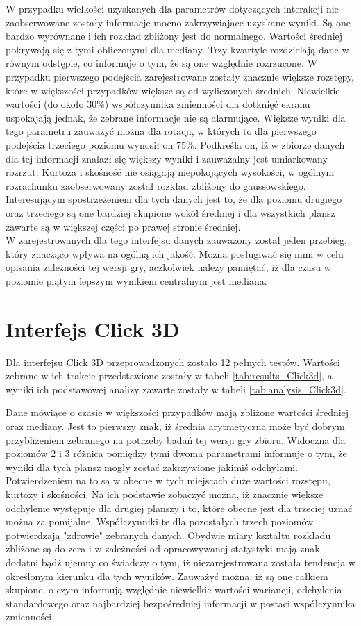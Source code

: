 \documentclass[a4paper,12pt,numbers=noenddot]{report}
\begin{document}
W przypadku wielkości uzyskanych dla parametrów dotyczących interakcji nie zaobserwowane zostały informacje mocno zakrzywiające uzyskane wyniki. Są one bardzo wyrównane i ich rozkład zbliżony jest do normalnego. Wartości średniej pokrywają się z tymi obliczonymi dla mediany. Trzy kwartyle rozdzielają dane w równym odstępie, co informuje o tym, że są one względnie rozrzucone. W przypadku pierwszego podejścia zarejestrowane zostały znacznie większe rozstępy, które w większości przypadków większe są od wyliczonych średnich. Niewielkie wartości (do około 30\%) współczynnika zmienności dla dotknięć ekranu uspokajają jednak, że zebrane informacje nie są alarmujące. Większe wyniki dla tego parametru zauważyć można dla rotacji, w których to dla pierwszego podejścia trzeciego poziomu wynosił on 75\%. Podkreśla on, iż w zbiorze danych dla tej informacji znalazł się większy wyniki i zauważalny jest umiarkowany rozrzut. Kurtoza i skośność nie osiągają niepokojących wysokości, w ogólnym rozrachunku zaobserwowany został rozkład zbliżony do gaussowskiego. Interesującym spostrzeżeniem dla tych danych jest to, że dla poziomu drugiego oraz trzeciego są one bardziej skupione wokół średniej i dla wszystkich plansz zawarte są w większej części po prawej stronie średniej.\\

W zarejestrowanych dla tego interfejsu danych zauważony został jeden przebieg, który znacząco wpływa na ogólną ich jakość. Można posługiwać się nimi w celu opisania zależności tej wersji gry, aczkolwiek należy pamiętać, iż dla czasu w poziomie piątym lepszym wynikiem centralnym jest mediana.


\section{Interfejs Click 3D}%
Dla interfejsu Click 3D przeprowadzonych zostało 12 pełnych testów. Wartości zebrane w ich trakcie przedstawione zostały w tabeli \ref{tab:results_Click3d}, a wyniki ich podstawowej analizy zawarte zostały w tabeli \ref{tab:analysis_Click3d}.

Dane mówiące o czasie w większości przypadków mają zbliżone wartości średniej oraz mediany. Jest to pierwszy znak, iż średnia arytmetyczna może być dobrym przybliżeniem zebranego na potrzeby badań tej wersji gry zbioru. Widoczna dla poziomów 2 i 3 różnica pomiędzy tymi dwoma parametrami informuje o tym, że wyniki dla tych plansz mogły zostać zakrzywione jakimiś odchyłami. Potwierdzeniem na to są w obecne w tych miejscach duże wartości rozstępu, kurtozy i skośności. Na ich podstawie zobaczyć można, iż znacznie większe odchylenie występuje dla drugiej planszy i to, które obecne jest dla trzeciej uznać można za pomijalne. Współczynniki te dla pozostałych trzech poziomów potwierdzają "zdrowie" zebranych danych. Obydwie miary kształtu rozkładu zbliżone są do zera i w zależności od opracowywanej statystyki mają znak dodatni bądź ujemny co świadczy o tym, iż niezarejestrowana została tendencja w określonym kierunku dla tych wyników. Zauważyć można, iż są one całkiem skupione, o czym informują względnie niewielkie wartości wariancji, odchylenia standardowego oraz najbardziej bezpośredniej informacji w postaci współczynnika zmienności.
\end{document}
